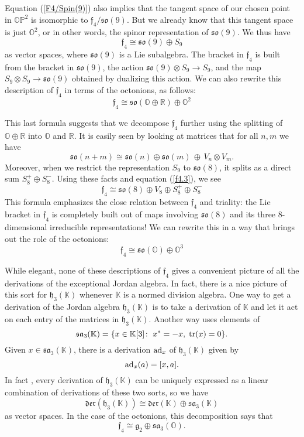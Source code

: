 \documentclass[12pt]{article}
\newcommand\R{{\mathbb R}}
\newcommand\K{{\mathbb K}}
\renewcommand\O{{\mathbb O}}
\newcommand\OP{{\mathbb {OP}}}
\newcommand{\so}{{\mathfrak {so}}}
\newcommand{\f}{{\mathfrak {f}}}
\newcommand{\g}{{\mathfrak {g}}}
\newcommand{\sa}{{\mathfrak {sa}}}
\newcommand{\h}{{\mathfrak {h}}}
\newcommand{\Der}{{\mathfrak {der}}}
\newcommand{\tensor}{\otimes}
\newcommand{\iso}{\cong}
\newcommand{\be}{\begin{equation}}
\newcommand{\ee}{\end{equation}}
\newcommand{\ad}{{\rm ad}}
\newcommand{\tr}{{\rm tr}}
\begin{document}
Equation (\ref{F4/Spin(9)}) also implies that the tangent space of our
chosen point in $\OP^2$ is isomorphic to $\f_4/\so(9)$.  But we already
know that this tangent space is just $\O^2$, or in other words, the
spinor representation of $\so(9)$.  We thus have
\be   \f_4 \iso \so(9) \oplus S_9    \label{f4.3}   \ee   
as vector spaces, where $\so(9)$ is a Lie subalgebra.  The bracket in  
$\f_4$ is built from the bracket in $\so(9)$, the action $\so(9) \tensor  
S_9 \to S_9$, and the map $S_9 \tensor S_9 \to \so(9)$  obtained by  
dualizing this action.  We can also rewrite this description
of $\f_4$ in terms of the octonions, as follows:   
\[   \f_4 \iso \so(\O \oplus \R) \oplus \O^2    \label{f4.4}   \]
   
This last formula suggests that we decompose $\f_4$ further using the   
splitting of $\O \oplus \R$ into $\O$ and $\R$.   
It is easily seen by looking at matrices that for all $n,m$ we have    
\be     
\so(n+m) \iso \so(n) \oplus \so(m) \, \oplus\, V_n \tensor V_m.    
\label{so(n+m)} \ee   
Moreover, when we restrict the representation  
$S_9$ to $\so(8)$, it splits as a direct sum $S_8^+ \oplus S_8^-$.  
Using these facts and equation (\ref{f4.3}), we see  
\be      
\f_4 \iso \so(8) \oplus V_8 \oplus S_8^+ \oplus S_8^-     
\label{f4.5}   
\ee   
This formula emphasizes the close relation between $\f_4$ and triality:   
the Lie bracket in $\f_4$ is completely built out of maps involving   
$\so(8)$ and its three 8-dimensional irreducible representations!     
We can rewrite this in a way that brings out the role of the octonions:   
\[
\f_4 \iso \so(\O) \oplus \O^3    
\label{f4.6}    
\]
  
While elegant, none of these descriptions of $\f_4$ gives a  convenient
picture of all the derivations of the exceptional Jordan algebra.   In
fact, there is a nice picture of this sort for $\h_3(\K)$ whenever $\K$
is a normed division algebra.    One way to get a derivation of the
Jordan algebra $\h_3(\K)$ is to take a derivation of $\K$  and let it
act on each entry of the matrices in $\h_3(\K)$.  Another way uses
elements of 
\[    \sa_3(\K) = \{  x \in \K[3] \colon \; x^* = -x,\; \tr(x) = 0 \}  .\]
Given $x \in \sa_3(\K)$, there is a derivation $\ad_x$ of $\h_3(\K)$ given 
by
\[          \ad_x (a) = [x,a]   .\]   
In fact \cite{BS}, every derivation of $\h_3(\K)$ can be uniquely 
expressed as a linear combination of derivations of these two sorts,
so we have 
\be   \Der(\h_3(\K)) \iso \Der(\K) \oplus \sa_3(\K)   \label{der(h3K)} \ee
as vector spaces.   In the case of the octonions, this decomposition 
says that
\[        \f_4 \iso \g_2 \oplus \sa_3(\O) .     \label{f4.7} \]
\end{document}
